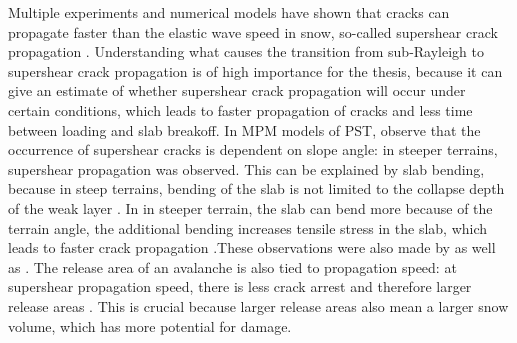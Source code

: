  Multiple experiments and numerical models have shown that cracks can propagate faster than the elastic wave speed in snow, so-called supershear crack propagation \parencite{trottetTransitionSubRayleighAnticrack2022,bobillierNumericalInvestigationCrack2024,bergfeldSignaturesSubRayleighSupershear2025}. Understanding what causes the transition from sub-Rayleigh to supershear crack propagation is of high importance for the thesis, because it can give an estimate of whether supershear crack propagation will occur under certain conditions, which leads to faster propagation of cracks and less time between loading and slab breakoff. In MPM models of PST, \cite{trottetTransitionSubRayleighAnticrack2022} observe that the occurrence of supershear cracks is dependent on slope angle: in steeper terrains, supershear propagation was observed. This can be explained by slab bending, because in steep terrains, bending of the slab is not limited to the collapse depth of the weak layer \parencite{trottetTransitionSubRayleighAnticrack2022}. In  in steeper terrain, the slab can bend more because of the terrain angle, the additional bending increases tensile stress in the slab, which leads to faster crack propagation \parencite{trottetTransitionSubRayleighAnticrack2022}.These observations were also made by \cite{bobillierNumericalInvestigationCrack2024} as well as \cite{bergfeldSignaturesSubRayleighSupershear2025}. The release area of an avalanche is also tied to propagation speed: at supershear propagation speed, there is less crack arrest and therefore larger release areas \parencite{trottetTransitionSubRayleighAnticrack2022,bergfeldSignaturesSubRayleighSupershear2025}. This is crucial because larger release areas also mean a larger snow volume, which has more potential for damage. \par

